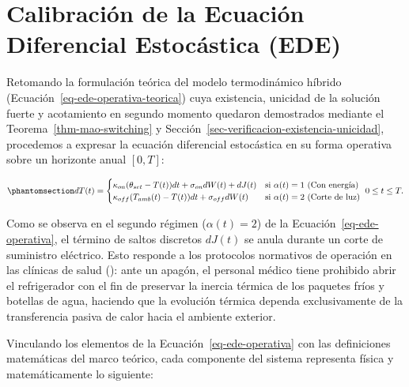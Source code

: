 \documentclass[
  spanish,
  us-letterpaper,
]{scrreprt}
\numberwithin{equation}{section}
\theoremstyle{plain}
\theoremstyle{plain}
\theoremstyle{definition}
\theoremstyle{plain}
\theoremstyle{remark}
\begin{document}
\section{Calibración de la Ecuación Diferencial Estocástica
(EDE)}\label{calibraciuxf3n-de-la-ecuaciuxf3n-diferencial-estocuxe1stica-ede}

Retomando la formulación teórica del modelo termodinámico híbrido
(Ecuación~\ref{eq-ede-operativa-teorica}) cuya existencia, unicidad de
la solución fuerte y acotamiento en segundo momento quedaron demostrados
mediante el Teorema~\ref{thm-mao-switching} y
Sección~\ref{sec-verificacion-existencia-unicidad}, procedemos a
expresar la ecuación diferencial estocástica en su forma operativa sobre
un horizonte anual \([0, T]\):

\begin{equation}\phantomsection\label{eq-ede-operativa}{
dT(t) = 
\begin{cases} 
\kappa_{on}(\theta_{set} - T(t))dt + \sigma_{on}dW(t) + dJ(t) & \text{si } \alpha(t) = 1 \text{ (Con energía)} \\ 
\kappa_{off}(T_{amb}(t) - T(t))dt + \sigma_{off}dW(t) & \text{si } \alpha(t) = 2 \text{ (Corte de luz)} 
\end{cases} \ 0 \leq t \leq T.
}\end{equation}

Como se observa en el segundo régimen (\(\alpha(t) = 2\)) de la
Ecuación~\ref{eq-ede-operativa}, el término de saltos discretos
\(dJ(t)\) se anula durante un corte de suministro eléctrico. Esto
responde a los protocolos normativos de operación en las clínicas de
salud (): ante un apagón, el personal médico tiene prohibido abrir el
refrigerador con el fin de preservar la inercia térmica de los paquetes
fríos y botellas de agua, haciendo que la evolución térmica dependa
exclusivamente de la transferencia pasiva de calor hacia el ambiente
exterior.

Vinculando los elementos de la Ecuación~\ref{eq-ede-operativa} con las
definiciones matemáticas del marco teórico, cada componente del sistema
representa física y matemáticamente lo siguiente:
\end{document}
